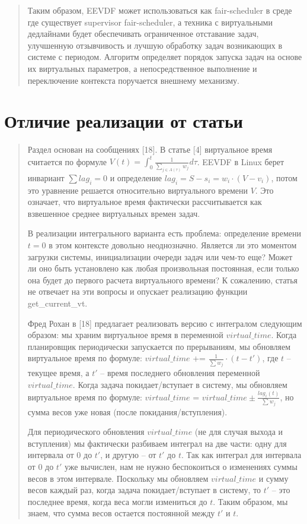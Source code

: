 \documentclass[12pt, oneside]{book}
\begin{document}
\begin{quote}
  Таким образом, EEVDF может использоваться как fair-scheduler в среде
  где существует supervisor fair-scheduler, а техника с виртуальными дедлайнами
  будет обеспечивать ограниченное отставание задач, улучшенную отзывчивость
  и лучшую обработку задач возникающих в системе с периодом.
  Алгоритм определяет порядок запуска задач на основе их виртуальных параметров,
  а непосредственное выполнение и переключение контекста поручается внешнему
  механизму.
\end{quote}

\section{Отличие реализации от статьи}
\begin{quote}
  Раздел основан на сообщениях [18].
  В статье [4] виртуальное время считается по формуле
  $ V(t) = \int_{0}^{t}\frac{1}{\sum_{j\in A(\tau)}w_j}d\tau $.
  EEVDF в Linux берет инвариант $ \sum{lag_i} = 0 $ и определение
  $ lag_i = S - s_i = w_i \cdot (V - v_i) $, потом это уравнение решается
  относительно виртуального времени $ V $. Это означает, что виртуальное
  время фактически рассчитывается как взвешенное среднее виртуальных времен
  задач.
  
  В реализации интегрального варианта есть проблема: определение времени $ t = 0 $ 
  в этом контексте довольно неоднозначно. Является ли это моментом загрузки
  системы, инициализации очереди задач или чем-то еще? Может ли оно быть
  установлено как любая произвольная постоянная, если только она будет до
  первого расчета виртуального времени? К сожалению, статья не отвечает
  на эти вопросы и опускает реализацию функции get\_current\_vt.

  Фред Рохан в [18] предлагает реализовать версию с интегралом следующим образом:
  мы храним виртуальное время в переменной $ virtual\_time $. Когда планировщик
  периодически запускается по прерываниям, мы обновляем виртуальное время по формуле:
  $ virtual\_time $ += $ \frac{1}{\sum{w_j}} \cdot (t - t') $, где $ t $ -- текущее время,
  а $ t' $ -- время последнего обновления переменной $ virtual\_time$.
  Когда задача покидает/вступает в систему, мы обновляем виртуальное время по формуле:
  $ virtual\_time $ = $ virtual\_time \pm \frac{lag_i(t)}{\sum{w_j}} $,
  но сумма весов уже новая (после покидания/вступления).

  Для периодического обновления $ virtual\_time $ (не для случая выхода и
  вступления) мы фактически разбиваем интеграл на две части: одну для
  интервала от $ 0 $ до $ t' $, и другую -- от $ t' $ до $ t $.
  Так как интеграл для интервала от $ 0 $ до $ t' $ уже вычислен, нам не нужно
  беспокоиться о изменениях суммы весов в этом интервале. Поскольку мы
  обновляем $ virtual\_time $ и сумму весов каждый раз, когда задача
  покидает/вступает в систему, то $ t' $ -- это последнее время, когда веса
  могли измениться до $ t $. Таким образом, мы знаем, что сумма весов остается
  постоянной между $ t' $ и $ t $.


\end{quote}
\end{document}
